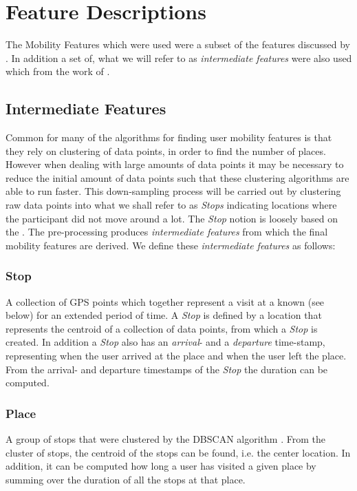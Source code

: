 \section{Feature Descriptions}
The Mobility Features which were used were a subset of the features discussed by \cite{Saeb2015,Canzian2015}. In addition a set of, what we will refer to as \textit{intermediate features} were also used which from the work of \cite{sparse-location-2014}. 

\subsection{Intermediate Features}
Common for many of the algorithms for finding user mobility features is that they rely on clustering of data points, in order to find the number of places. However when dealing with large amounts of data points it may be necessary to reduce the initial amount of data points such that these clustering algorithms are able to run faster. This down-sampling process will be carried out by clustering raw data points into what we shall refer to as \textit{Stops} indicating locations where the participant did not move around a lot. The \textit{Stop} notion is loosely based on the \cite{sparse-location-2014}. The pre-processing produces \textit{intermediate features} from which the final mobility features are derived. We define these \textit{intermediate features} as follows:

\subsubsection*{Stop}
A collection of GPS points which together represent a visit at a known  (see below) for an extended period of time. A \textit{Stop} is defined by a location that represents the centroid of a collection of data points, from which a \textit{Stop} is created. In addition a \textit{Stop} also has an \textit{arrival}- and a \textit{departure} time-stamp, representing when the user arrived at the place and when the user left the place. From the arrival- and departure timestamps of the \textit{Stop} the duration can be computed.

\subsubsection*{Place}
A group of stops that were clustered by the DBSCAN algorithm \cite{density-based-1996}. From the cluster of stops, the centroid of the stops can be found, i.e. the center location. In addition, it can be computed how long a user has visited a given place by summing over the duration of all the stops at that place.

